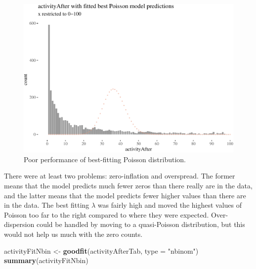 \documentclass[10pt,]{scrartcl}
\newenvironment{Shaded}{\begin{snugshade}}{\end{snugshade}}
\newcommand{\KeywordTok}[1]{\textcolor[rgb]{0.13,0.29,0.53}{\textbf{#1}}}
\newcommand{\DataTypeTok}[1]{\textcolor[rgb]{0.13,0.29,0.53}{#1}}
\newcommand{\StringTok}[1]{\textcolor[rgb]{0.31,0.60,0.02}{#1}}
\newcommand{\NormalTok}[1]{#1}
\begin{document}
\normalsize

\begin{figure}

\begin{center}\includegraphics[width=1\linewidth]{redditAnalysisWalkthrough_files/figure-latex/unnamed-chunk-72-1} \end{center}
\caption{Poor performance of best-fitting Poisson distribution.}
\end{figure}

There were at least two problems: zero-inflation and overspread. The
former means that the model predicts much fewer zeros than there really
are in the data, and the latter means that the model predicts fewer
higher values than there are in the data. The best fitting \(\lambda\)
was fairly high and moved the highest values of Poisson too far to the
right compared to where they were expected. Over-dispersion could be
handled by moving to a quasi-Poisson distribution, but this would not
help us much with the zero counts.

\footnotesize

\begin{Shaded}
\begin{Highlighting}[]
\NormalTok{activityFitNbin <-}\StringTok{ }\KeywordTok{goodfit}\NormalTok{(activityAfterTab, }\DataTypeTok{type =} \StringTok{"nbinom"}\NormalTok{)}
\KeywordTok{summary}\NormalTok{(activityFitNbin)}
\end{Highlighting}
\end{Shaded}
\end{document}
